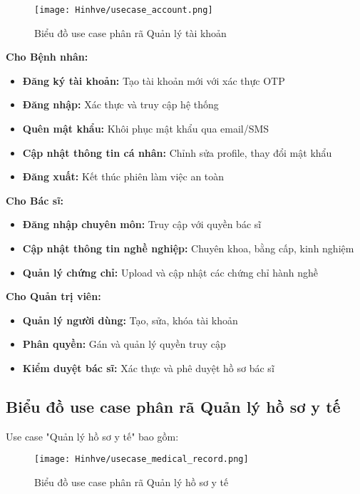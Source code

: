 \documentclass[../DoAn.tex]{subfiles}
\begin{document}
\begin{figure}[H]
    \centering
    \texttt{[image: Hinhve/usecase\_account.png]}
    \caption{Biểu đồ use case phân rã Quản lý tài khoản}
    \label{fig:usecase_account}
\end{figure}

\textbf{Cho Bệnh nhân:}
\begin{itemize}
    \item \textbf{Đăng ký tài khoản:} Tạo tài khoản mới với xác thực OTP
    \item \textbf{Đăng nhập:} Xác thực và truy cập hệ thống
    \item \textbf{Quên mật khẩu:} Khôi phục mật khẩu qua email/SMS
    \item \textbf{Cập nhật thông tin cá nhân:} Chỉnh sửa profile, thay đổi mật khẩu
    \item \textbf{Đăng xuất:} Kết thúc phiên làm việc an toàn
\end{itemize}

\textbf{Cho Bác sĩ:}
\begin{itemize}
    \item \textbf{Đăng nhập chuyên môn:} Truy cập với quyền bác sĩ
    \item \textbf{Cập nhật thông tin nghề nghiệp:} Chuyên khoa, bằng cấp, kinh nghiệm
    \item \textbf{Quản lý chứng chỉ:} Upload và cập nhật các chứng chỉ hành nghề
\end{itemize}

\textbf{Cho Quản trị viên:}
\begin{itemize}
    \item \textbf{Quản lý người dùng:} Tạo, sửa, khóa tài khoản
    \item \textbf{Phân quyền:} Gán và quản lý quyền truy cập
    \item \textbf{Kiểm duyệt bác sĩ:} Xác thực và phê duyệt hồ sơ bác sĩ
\end{itemize}

\subsection{Biểu đồ use case phân rã Quản lý hồ sơ y tế}
\label{subsection:2.2.4}

Use case "Quản lý hồ sơ y tế" bao gồm:

\begin{figure}[H]
    \centering
    \texttt{[image: Hinhve/usecase\_medical\_record.png]}
    \caption{Biểu đồ use case phân rã Quản lý hồ sơ y tế}
    \label{fig:usecase_medical_record}
\end{figure}
\end{document}

